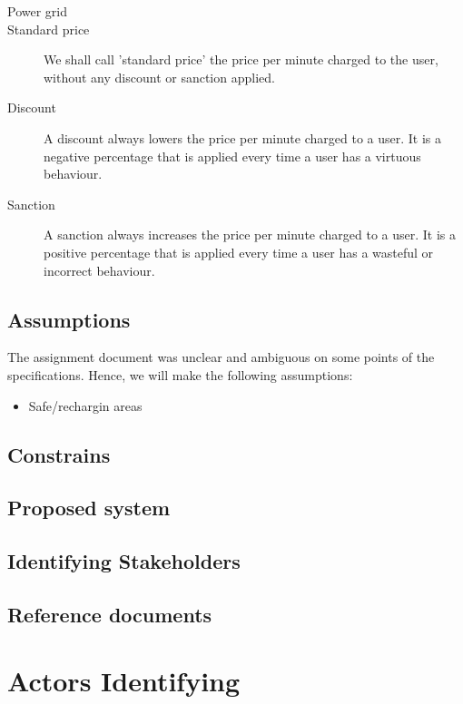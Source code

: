 \documentclass{article}
\begin{document}
\begin{description}
				\item[Power grid] %
				
				\item[Standard price] We shall call 'standard price' the price per minute charged to the user, without any discount or sanction applied. 
				
				\item[Discount] A discount always lowers the price per minute charged to a user. It is a negative percentage that is applied every time a user has a virtuous behaviour. 
				\item[Sanction] A sanction always increases the price per minute charged to a user. It is a positive percentage that is applied every time a user has a wasteful or incorrect behaviour. 
				
			\end{description}

		\subsection{Assumptions}
			The assignment document was unclear and ambiguous on some points of the specifications. Hence, we will make the following assumptions:
			
			\begin{itemize}
				\item Safe/rechargin areas
			\end{itemize}

		\subsection{Constrains}

		\subsection{Proposed system}

		\subsection{Identifying Stakeholders}

		\subsection{Reference documents}

	\newpage
	\section{Actors Identifying}
\end{document}

